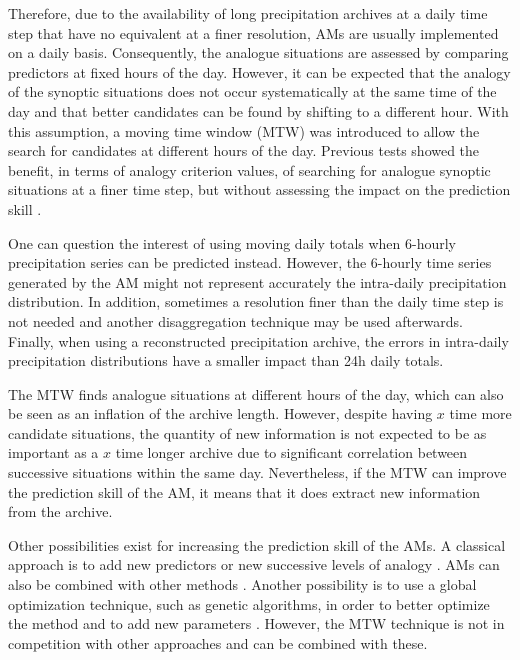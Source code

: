 \documentclass[hess, manuscript]{copernicus}
\begin{document}
	Therefore, due to the availability of long precipitation archives at a daily time step that have no equivalent at a finer resolution, AMs are usually implemented on a daily basis. Consequently, the analogue situations are assessed by comparing predictors at fixed hours of the day. However, it can be expected that the analogy of the synoptic situations does not occur systematically at the same time of the day and that better candidates can be found by shifting to a different hour. With this assumption, a moving time window (MTW) was introduced to allow the search for candidates at different hours of the day. Previous tests showed the benefit, in terms of analogy criterion values, of searching for analogue synoptic situations at a finer time step, but without assessing the impact on the prediction skill \citep{Finet2008}.
	
	One can question the interest of using moving daily totals when 6-hourly precipitation series can be predicted instead. However, the 6-hourly time series generated by the AM might not represent accurately the intra-daily precipitation distribution. In addition, sometimes a resolution finer than the daily time step is not needed and another disaggregation technique may be used afterwards. Finally, when using a reconstructed precipitation archive, the errors in intra-daily precipitation distributions have a smaller impact than 24h daily totals.
	
	The MTW finds analogue situations at different hours of the day, which can also be seen as an inflation of the archive length. However, despite having $x$ time more candidate situations, the quantity of new information is not expected to be as important as a $x$ time longer archive due to significant correlation between successive situations within the same day. Nevertheless, if the MTW can improve the prediction skill of the AM, it means that it does extract new information from the archive.
	
	Other possibilities exist for increasing the prediction skill of the AMs. A classical approach is to add new predictors or new successive levels of analogy \citep[see e.g.][]{Horton2012a, BenDaoud2016, Caillouet2016}. AMs can also be combined with other methods \citep[see e.g.][]{Chardon2014}. Another possibility is to use a global optimization technique, such as genetic algorithms, in order to better optimize the method and to add new parameters \citep{Horton2017}. However, the MTW technique is not in competition with other approaches and can be combined with these.
	
\end{document}
